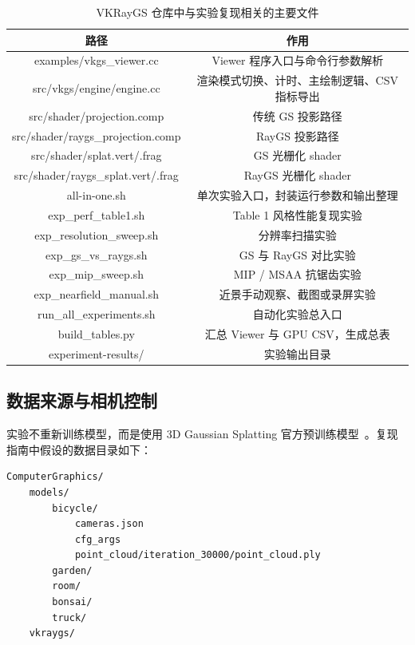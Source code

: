 \documentclass[12pt,hyperref,a4paper,UTF8]{ctexart}
\begin{document}
\begin{table}[H]
    \centering
    \caption{VKRayGS 仓库中与实验复现相关的主要文件}
    \label{tab:repo_structure}
    \setlength{\tabcolsep}{2pt}
    \renewcommand{\arraystretch}{1.2}
    \begin{tabular}{cc}
        \bottomrule[1.5pt]
        路径 & 作用 \\
        \midrule[0.5pt]
        examples/vkgs\_viewer.cc & Viewer 程序入口与命令行参数解析 \\
        src/vkgs/engine/engine.cc & 渲染模式切换、计时、主绘制逻辑、CSV 指标导出 \\
        src/shader/projection.comp & 传统 GS 投影路径 \\
        src/shader/raygs\_projection.comp & RayGS 投影路径 \\
        src/shader/splat.vert/.frag & GS 光栅化 shader \\
        src/shader/raygs\_splat.vert/.frag & RayGS 光栅化 shader \\
        all-in-one.sh & 单次实验入口，封装运行参数和输出整理 \\
        exp\_perf\_table1.sh & Table 1 风格性能复现实验 \\
        exp\_resolution\_sweep.sh & 分辨率扫描实验 \\
        exp\_gs\_vs\_raygs.sh & GS 与 RayGS 对比实验 \\
        exp\_mip\_sweep.sh & MIP / MSAA 抗锯齿实验 \\
        exp\_nearfield\_manual.sh & 近景手动观察、截图或录屏实验 \\
        run\_all\_experiments.sh & 自动化实验总入口 \\
        build\_tables.py & 汇总 Viewer 与 GPU CSV，生成总表 \\
        experiment-results/ & 实验输出目录 \\
        \toprule[1.5pt]
    \end{tabular}
\end{table}



\subsection{数据来源与相机控制}
实验不重新训练模型，而是使用 3D Gaussian Splatting 官方预训练模型~\cite{inriags}。复现指南中假设的数据目录如下：

\begin{lstlisting}
ComputerGraphics/
    models/
        bicycle/
            cameras.json
            cfg_args
            point_cloud/iteration_30000/point_cloud.ply
        garden/
        room/
        bonsai/
        truck/
    vkraygs/
\end{lstlisting}
\end{document}
